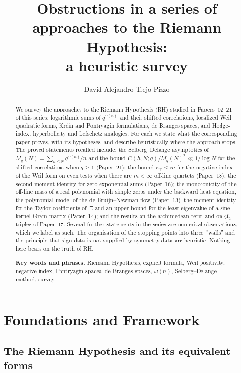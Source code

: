 \documentclass[11pt]{amsart}
\title[Obstructions in a series of approaches to RH]{Obstructions in a series of approaches to the Riemann Hypothesis:\\ a heuristic survey}
\author{David Alejandro Trejo Pizzo}
\theoremstyle{definition}
\theoremstyle{remark}
\newcommand{\om}{\omega}
\newcommand{\kV}{\kappa_{\mathcal V}}
\begin{document}
\begin{abstract}
We survey the approaches to the Riemann Hypothesis (RH) studied in Papers~02--21 of
this series: logarithmic sums of $q^{\om(n)}$ and their shifted correlations, localized
Weil quadratic forms, Kre\u\i n and Pontryagin formulations, de Branges spaces, and
Hodge-index, hyperbolicity and Lefschetz analogies. For each we state what the
corresponding paper proves, with its hypotheses, and describe heuristically where the
approach stops. The proved statements recalled include: the Selberg--Delange asymptotics
of $M_q(N)=\sum_{n\le N}q^{\om(n)}/n$ and the bound
$C(h,N;q)/M_q(N)^2\ll1/\log N$ for the shifted correlations when $q\ge1$ (Paper~21); the bound
$\kV\le m$ for the negative index of the Weil form on even tests when there are
$m<\infty$ off-line quartets (Paper~18); the second-moment identity for zero exponential
sums (Paper~16); the monotonicity of the off-line mass of a real polynomial with simple zeros under the
backward heat equation, the polynomial model of the de Bruijn--Newman flow (Paper~13); the moment identity for the Taylor coefficients of $\Xi$ and an upper bound
for the least eigenvalue of a sine-kernel Gram matrix (Paper~14); and the results on the
archimedean term and on $\mathfrak{sl}_2$ triples of Paper~17. Several further statements
in the series are numerical observations, which we label as such. The organisation of
the stopping points into three ``walls'' and the principle that sign data is not
supplied by symmetry data are heuristic. Nothing here bears on the truth of RH.

\medskip
\noindent\textbf{Key words and phrases.}
Riemann Hypothesis, explicit formula, Weil positivity, negative index, Pontryagin spaces,
de Branges spaces, $\om(n)$, Selberg--Delange method, survey.
\end{abstract}

\maketitle

\tableofcontents

\section{Foundations and Framework}
\label{sec:foundations}

\subsection{The Riemann Hypothesis and its equivalent forms}
\label{ss:RH}
\end{document}
